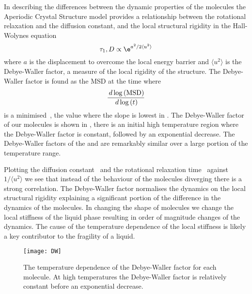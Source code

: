 In describing the differences between the dynamic properties of the molecules the Aperiodic Crystal Structure model provides a relationship between the rotational relaxation and the diffusion constant, and the local structural rigidity in the Hall-Wolynes equation~\cite{hall:87,dyre:96}
\begin{equation}
    \tau_1, D \propto \e^{a^2/2\langle u^2\rangle}
\end{equation}
where $a$ is the displacement to overcome the local energy barrier and $\langle u^2 \rangle$ is the Debye-Waller factor, a measure of the local rigidity of the structure. The Debye-Waller factor is found as the MSD at the time where 
\begin{equation}
    \frac{\,d \log{(\text{MSD})}}{\,d \log{(t)}}
\end{equation}
is a minimised~\cite{larini:08}, the value where the slope is lowest in . The Debye-Waller factor of our molecules is shown in , there is an initial high temperature region where the Debye-Waller factor is constant, followed by an exponential decrease. The Debye-Waller factors of the \dcon and \tri are remarkably similar over a large portion of the temperature range.

Plotting the diffusion constant~ and the rotational relaxation time~ against $1/\langle u^2 \rangle$ we see that instead of the behaviour of the molecules diverging there is a strong correlation. The Debye-Waller factor normalises the dynamics on the local structural rigidity explaining a significant portion of the difference in the dynamics of the molecules. In changing the shape of molecules we change the local stiffness of the liquid phase resulting in order of magnitude changes of the dynamics. The cause of the temperature dependence of the local stiffness is likely a key contributor to the fragility of a liquid.

\begin{figure}
    \centering
    \texttt{[image: DW]}
    \caption{The temperature dependence of the Debye-Waller factor for each molecule. At high temperatures the Debye-Waller factor is relatively constant before an exponential decrease.}
    \label{fig:DW}
\end{figure}

